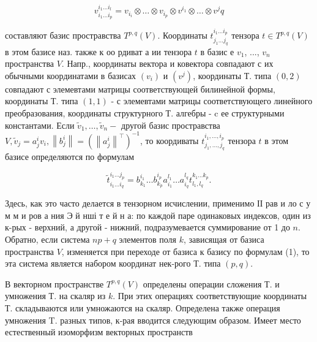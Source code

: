 \documentclass[10pt]{article}
\begin{document}
\[

v_{i_{1} \ldots i_{p}}^{i_{1} \ldots i_{l}}=v_{i_{i}} \otimes \ldots \otimes v_{i_{p}} \otimes v^{i_{1}} \otimes \ldots \otimes v^{j} q

\]



составляют базис простравства $T^{p, q}(V)$. Координаты $t_{j_{1} \ldots j_{q}}^{i_{1} \ldots i_{p}}$ тензора $t \in T^{p, q}(V)$ в этом базисе наз. также к оо рдиват а ии тензора $t$ в базис е $v_{1}$, ..., $v_{n}$ пространства $V$. Напр., координаты вектора и ковектора совпадают с их обычными координатами в базисах $\left(v_{i}\right)$ и $\left(v^{j}\right)$, координаты Т. типа $(0,2)$ совпадают с элемевтами матрицы соответствующей билинейной формы, координаты Т. типа $(1,1)$ - с элемевтами матрицы соответствующего линейного преобразования, координаты структурного Т. алгебры - c ее структурными константами. Если $\tilde{v}_{1}, \ldots, \tilde{v}_{n}-$ другой базис простравства $V, \tilde{v}_{j}=a_{j}^{i} v_{i},\left\|b_{j}^{i}\right\|=\left(\left\|a_{j}^{i}\right\|^{\top}\right)^{-1}$, то коордиваты $t_{j_{1}, \ldots, j_{q}}^{i_{1}, \ldots, i_{p}}$ тензора $t$ в этом базисе определяются по формулам



\[

\tilde{t}_{i_{1} \ldots i_{q}}^{i_{1} \ldots j_{p}}=b_{k_{1}}^{i_{1}} \ldots b_{k_{p}}^{i_{p}} a_{i_{1}}^{l_{1}} \ldots a_{i_{q}}^{l_{q}} t_{l_{1}, l_{q}}^{k_{1} \ldots k_{p}} .

\]



Здесь, как это часто делается в тензорном исчислении, применимо ІІ рав и ло с у м м и ров а ния Э й нші т е й н а: по каждой паре одинаковых индексов, один из к-рых - верхний, а другой - нижний, подразумевается суммирование от 1 до $n$. Обратно, если система $n p+q$ элементов поля $k$, зависящая от базиса пространства $V$, изменяется при переходе от базиса к базису по формулам (1), то эта система является набором координат нек-рого Т. типа $(p, q)$.



В векторном пространстве $T^{p, q}(V)$ определены операции сложения Т. и умножения Т. на скаляр из $k$. При этих операциях соответствующие координаты Т. складываются или умножаются на скаляр. Определена также операция умножения T. разных типов, к-рая вводится следующим образом. Имеет место естественный изоморфизм векторных пространств
\end{document}
